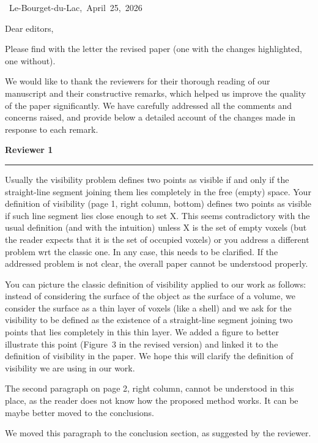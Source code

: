 \documentclass[10pt,french]{letter}
\date{Le-Bourget-du-Lac, le \today}
\newcounter{remarkcount}
\newcommand{\reviewer}[1]{%
  \setcounter{remarkcount}{1}%
  \medskip
  \noindent\textbf{\large Reviewer #1}
  \smallskip\par
  \noindent\rule{\linewidth}{0.6pt}
  \medskip
}
\begin{document}
  \mbox{~}\hfill\mbox{Le-Bourget-du-Lac, April 25, 2026}
  \medskip

  Dear editors,

  Please find with the letter the revised paper (one with the changes highlighted, one without).

  We would like to thank the reviewers for their thorough reading of our manuscript and their
  constructive remarks, which helped us improve the quality of the paper significantly.
  We have carefully addressed all the comments and concerns raised, and provide below a
  detailed account of the changes made in response to each remark.

  \reviewer{1}

  \begin{remark}
    Usually the visibility problem defines two points as visible if and only if the straight-line
    segment joining them lies completely in the free (empty) space. Your definition of visibility
    (page 1, right column, bottom) defines two points as visible if such line segment lies close
    enough to set X. This seems contradictory with the usual definition (and with the intuition)
    unless X is the set of empty voxels (but the reader expects that it is the set of occupied voxels)
    or you address a different problem wrt the classic one. In any case, this needs to be clarified.
    If the addressed problem is not clear, the overall paper cannot be understood properly.
  \end{remark}
  \begin{response}
    You can picture the classic definition of visibility applied to our work as follows: instead
    of considering the surface of the object as the surface of a volume, we consider the surface
    as a thin layer of voxels (like a shell) and we ask for the visibility to be defined as the
    existence of a straight-line segment joining two points that lies completely in this thin layer.
    We added a figure to better illustrate this point (Figure~3 in the revised version) and linked
    it to the definition of visibility in the paper. We hope this will clarify the definition of
    visibility we are using in our work.
  \end{response}

  \begin{remark}
    The second paragraph on page 2, right column, cannot be understood in this place, as the reader
    does not know how the proposed method works. It can be maybe better moved to the conclusions.
  \end{remark}
  \begin{response}
    We moved this paragraph to the conclusion section, as suggested by the reviewer.
  \end{response}
\end{document}
